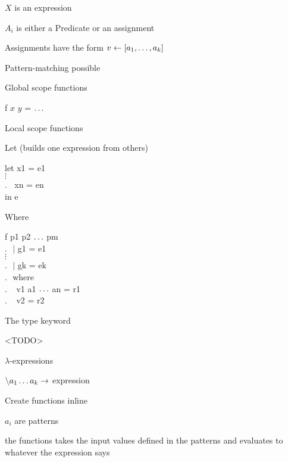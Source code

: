 			\item $X$ is an expression
			\item $A_i$ is either a Predicate or an assignment
			\item Assignments have the form $v \leftarrow [a_1, \mathellipsis, a_k]$
			\item Pattern-matching possible
		\enumend
		\item Global scope functions
		\enumstart
			\item f $x$ $y$ = $\mathellipsis$
		\enumend
		\item Local scope functions
		\enumstart
			\item Let (builds one expression from others)
			\enumstart
				\item let x1 = e1\\$\vdots$\\.$\ \ \ \ $xn = en\\in e
			\enumend
			\item Where
			\enumstart
				\item f p1 p2 $\mathellipsis$ pm\\.$\ \ \ |$ g1 = e1\\$\vdots$\\.$\ \ \ |$ gk = ek\\.$\ \ \ $where\\.$\ \ \ \ \ $v1 a1 $\mathellipsis$ an = r1\\.$\ \ \ \ \ $v2 = r2
			\enumend
		\enumend
		\item The type keyword
		\enumstart
			\item <TODO>
		\enumend
		\item $\lambda$-expressions
		\enumstart
			\item $\backslash a_1 \mathellipsis a_k \rightarrow$ expression
			\item Create functions inline
			\item $a_i$ are patterns
			\item the functions takes the input values defined in the patterns and evaluates to whatever the expression says
		\enumend
	\enumend
\enumend


